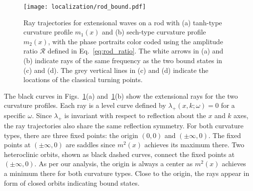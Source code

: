 %
\begin{figure}
  \begin{center}
    \texttt{[image: localization/rod\_bound.pdf]}
  \end{center}
  \caption{%
    Ray trajectories for extensional waves on a rod with (a) tanh-type curvature profile $m_{1}(x)$ and (b) sech-type curvature profile $m_{2}(x)$, with the phase portraits color coded using the amplitude ratio $\mathscr{R}$ defined in Eq.~\eqref{eq:rod_ratio}.
    The white arrows in (a) and (b) indicate rays of the same frequency as the two bound states in (c) and (d).
    The grey vertical lines in (c) and (d) indicate the locations of the classical turning points.
  }
  \label{fig:rod_bound}
\end{figure}

The black curves in Figs.~\ref{fig:rod_bound}(a) and~\ref{fig:rod_bound}(b) show the extensional rays for the two curvature profiles.
Each ray is a level curve defined by $\lambda_{+}(x, k; \omega) = 0$ for a specific $\omega$.
Since $\lambda_{+}$ is invariant with respect to reflection about the $x$ and $k$ axes, the ray trajectories also share the same reflection symmetry.
For both curvature types, there are three fixed points: the origin $(0, 0)$ and $(\pm\infty, 0)$.
The fixed points at $(\pm\infty, 0)$ are saddles since $m^{2}(x)$ achieves its maximum there.
Two heteroclinic orbits, shown as black dashed curves, connect the fixed points at $(\pm\infty, 0)$.
As per our analysis, the origin is always a center as $m^{2}(x)$ achieves a minimum there for both curvature types.
Close to the origin, the rays appear in form of closed orbits indicating bound states.

